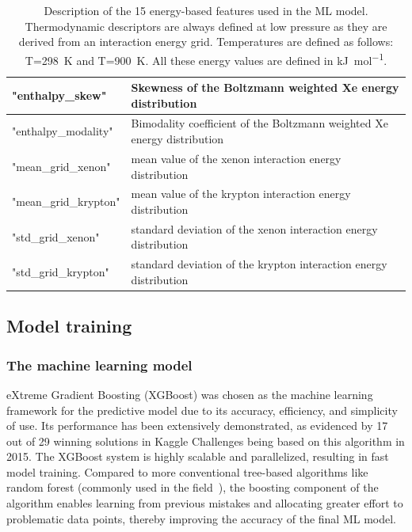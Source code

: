 \documentclass[main]{subfiles}
\begin{document}
\begin{table}[ht]
\begin{tabular}{|l|m{10cm}|}
  \hline
  "enthalpy\_skew"  & Skewness of the Boltzmann weighted Xe energy distribution \\
  \hline
  "enthalpy\_modality"  & Bimodality coefficient of the Boltzmann weighted Xe energy distribution \\
  \hline
  "mean\_grid\_xenon"  & mean value of the xenon interaction energy distribution \\
  \hline
  "mean\_grid\_krypton"  & mean value of the krypton interaction energy distribution \\
  \hline
  "std\_grid\_xenon"  & standard deviation of the xenon interaction energy distribution \\
  \hline
  "std\_grid\_krypton"  & standard deviation of the krypton interaction energy distribution \\
  \hline
  \end{tabular}
  \caption{Description of the 15 energy-based features used in the ML model. Thermodynamic descriptors are always defined at low pressure as they are derived from an interaction energy grid. Temperatures are defined as follows: T=298~\si{\kelvin} and T=900~\si{\kelvin}. All these energy values are defined in \si{\kilo\joule\per\mole}.}\label{tab:energy_descriptors}
  \end{table}
  
  \clearpage

\subsection{Model training}

\subsubsection{The machine learning model}

eXtreme Gradient Boosting (XGBoost) was chosen as the machine learning framework for the predictive model due to its accuracy, efficiency, and simplicity of use. Its performance has been extensively demonstrated, as evidenced by 17 out of 29 winning solutions in Kaggle Challenges being based on this algorithm in 2015. The XGBoost system is highly scalable and parallelized, resulting in fast model training.\autocite{chen2016xgboost} Compared to more conventional tree-based algorithms like random forest (commonly used in the field~\autocite{Simon_2015}), the boosting component of the algorithm enables learning from previous mistakes and allocating greater effort to problematic data points, thereby improving the accuracy of the final ML model.
\end{document}
